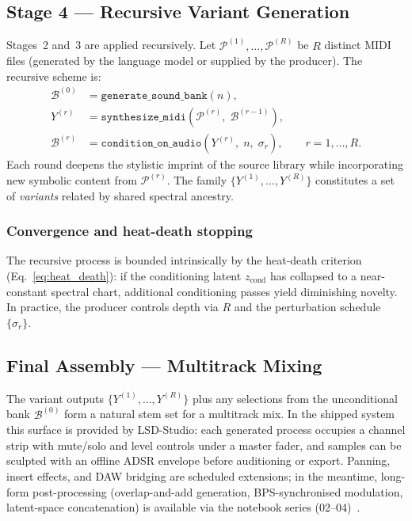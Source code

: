 \documentclass[12pt,a4paper]{article}
\begin{document}
\subsection{Stage 4 — Recursive Variant Generation}
\label{subsec:stage4}

Stages~2 and~3 are applied recursively. Let $\mathcal{P}^{(1)}, \ldots,
\mathcal{P}^{(R)}$ be $R$ distinct MIDI files (generated by the language
model or supplied by the producer). The recursive scheme is:
\begin{align}
  \mathcal{B}^{(0)} &= \texttt{generate\_sound\_bank}(n),
  \label{eq:recursive_init}\\
  Y^{(r)} &= \texttt{synthesize\_midi}\!\left(\mathcal{P}^{(r)},\;
    \mathcal{B}^{(r-1)}\right),
  \label{eq:recursive_synth}\\
  \mathcal{B}^{(r)} &= \texttt{condition\_on\_audio}\!\left(Y^{(r)},\;
    n,\; \sigma_r\right),
  \qquad r = 1, \ldots, R.
  \label{eq:recursive_cond}
\end{align}
Each round deepens the stylistic imprint of the source library while
incorporating new symbolic content from $\mathcal{P}^{(r)}$. The family
$\{Y^{(1)}, \ldots, Y^{(R)}\}$ constitutes a set of \emph{variants}
related by shared spectral ancestry.

\subsubsection{Convergence and heat-death stopping}

The recursive process is bounded intrinsically by the heat-death criterion
(Eq.~\ref{eq:heat_death}): if the conditioning latent $z_{\mathrm{cond}}$
has collapsed to a near-constant spectral chart, additional conditioning
passes yield diminishing novelty. In practice, the producer controls depth
via $R$ and the perturbation schedule $\{\sigma_r\}$.

\subsection{Final Assembly — Multitrack Mixing}
\label{subsec:mixing}

The variant outputs $\{Y^{(1)}, \ldots, Y^{(R)}\}$ plus any selections
from the unconditional bank $\mathcal{B}^{(0)}$ form a natural stem set
for a multitrack mix. In the shipped system this surface is provided by
LSD-Studio: each generated process occupies a channel strip with
mute/solo and level controls under a master fader, and samples can be
sculpted with an offline ADSR envelope before auditioning or export.
Panning, insert effects, and DAW bridging are scheduled extensions; in
the meantime, long-form post-processing (overlap-and-add generation,
BPS-synchronised modulation, latent-space concatenation) is available
via the notebook series (02--04)~\cite{lsd}.
\end{document}
